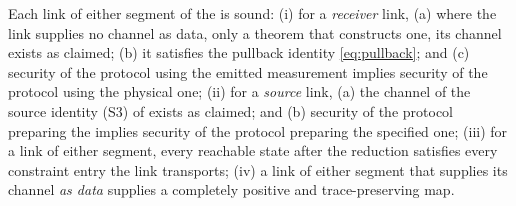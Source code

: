 \begin{assumption}\label{ass:link}
Each link of either segment of the  is sound:
(i) for a \emph{receiver} link, (a) where the link supplies no channel as
data, only a theorem that constructs one, its channel exists as claimed;
(b) it satisfies the pullback identity \eqref{eq:pullback}; and (c) security
of the protocol using the emitted measurement implies security of the
protocol using the physical one;
(ii) for a \emph{source} link, (a) the channel of the source identity (S3) of
 exists as claimed; and (b) security of
the protocol preparing the  implies security of the
protocol preparing the specified one;
(iii) for a link of either segment, every reachable state after the reduction
satisfies every constraint entry the link transports;
(iv) a link of either segment that supplies its channel \emph{as data}
supplies a completely positive and trace-preserving map.
\end{assumption}
